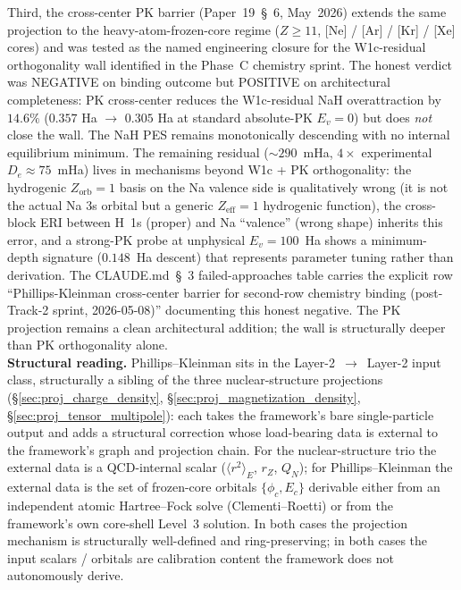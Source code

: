 \documentclass[11pt]{article}
\begin{document}
Third, the cross-center PK barrier
(Paper~19~\S~6, May~2026) extends the same
projection to the heavy-atom-frozen-core regime
($Z \geq 11$, [Ne] / [Ar] / [Kr] / [Xe] cores) and was tested as the
named engineering closure for the W1c-residual orthogonality wall
identified in the Phase~C chemistry sprint.  The honest verdict was
NEGATIVE on binding outcome but POSITIVE on architectural completeness:
PK cross-center reduces the W1c-residual NaH overattraction by
$14.6\%$ ($0.357$ Ha $\to$ $0.305$ Ha at standard absolute-PK
$E_v = 0$) but does \emph{not} close the wall.  The NaH PES remains
monotonically descending with no internal equilibrium minimum.  The
remaining residual ($\sim 290$~mHa, $4\times$ experimental
$D_e \approx 75$~mHa) lives in mechanisms beyond W1c + PK orthogonality:
the hydrogenic $Z_\text{orb} = 1$ basis on the Na valence side is
qualitatively wrong (it is not the actual Na 3s orbital but a generic
$Z_\text{eff} = 1$ hydrogenic function), the cross-block ERI between
H~1s (proper) and Na ``valence'' (wrong shape) inherits this error,
and a strong-PK probe at unphysical $E_v = 100$~Ha shows a
minimum-depth signature ($0.148$~Ha descent) that represents parameter
tuning rather than derivation.  The CLAUDE.md~\S~3 failed-approaches
table carries the explicit row ``Phillips-Kleinman cross-center
barrier for second-row chemistry binding (post-Track-2 sprint,
2026-05-08)'' documenting this honest negative.  The PK projection
remains a clean architectural addition; the wall is structurally
deeper than PK orthogonality alone.\\
\textbf{Structural reading.}  Phillips--Kleinman sits in the
Layer-2~$\to$~Layer-2 input class, structurally a sibling of the three
nuclear-structure projections (\S\ref{sec:proj_charge_density},
\S\ref{sec:proj_magnetization_density}, \S\ref{sec:proj_tensor_multipole}):
each takes the framework's bare single-particle output and adds a
structural correction whose load-bearing data is external to the
framework's graph and projection chain.  For the nuclear-structure
trio the external data is a QCD-internal scalar
($\langle r^2\rangle_E$, $r_Z$, $Q_N$); for Phillips--Kleinman the
external data is the set of frozen-core orbitals
$\{\phi_c, E_c\}$ derivable either from an independent atomic
Hartree--Fock solve (Clementi--Roetti) or from the framework's own
core-shell Level~3 solution.  In both cases the projection mechanism
is structurally well-defined and ring-preserving; in both cases the
input scalars / orbitals are calibration content the framework does
not autonomously derive.
\end{document}
